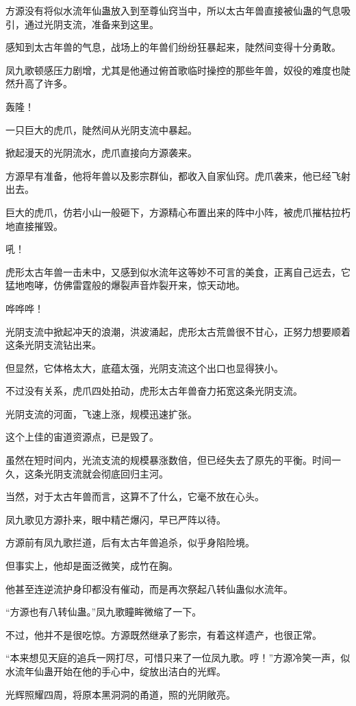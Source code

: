 \begin{this_body}
方源没有将似水流年仙蛊放入到至尊仙窍当中，所以太古年兽直接被仙蛊的气息吸引，通过光阴支流，准备来到这里。

感知到太古年兽的气息，战场上的年兽们纷纷狂暴起来，陡然间变得十分勇敢。

凤九歌顿感压力剧增，尤其是他通过俯首歌临时操控的那些年兽，奴役的难度也陡然升高了许多。

轰隆！

一只巨大的虎爪，陡然间从光阴支流中暴起。

掀起漫天的光阴流水，虎爪直接向方源袭来。

方源早有准备，他将年兽以及影宗群仙，都收入自家仙窍。虎爪袭来，他已经飞射出去。

巨大的虎爪，仿若小山一般砸下，方源精心布置出来的阵中小阵，被虎爪摧枯拉朽地直接摧毁。

吼！

虎形太古年兽一击未中，又感到似水流年这等妙不可言的美食，正离自己远去，它猛地咆哮，仿佛雷霆般的爆裂声音炸裂开来，惊天动地。

哗哗哗！

光阴支流中掀起冲天的浪潮，洪波涌起，虎形太古荒兽很不甘心，正努力想要顺着这条光阴支流钻出来。

但显然，它体格太大，底蕴太强，光阴支流这个出口也显得狭小。

不过没有关系，虎爪四处拍动，虎形太古年兽奋力拓宽这条光阴支流。

光阴支流的河面，飞速上涨，规模迅速扩张。

这个上佳的宙道资源点，已是毁了。

虽然在短时间内，光流支流的规模暴涨数倍，但已经失去了原先的平衡。时间一久，这条光阴支流就会彻底回归主河。

当然，对于太古年兽而言，这算不了什么，它毫不放在心头。

凤九歌见方源扑来，眼中精芒爆闪，早已严阵以待。

方源前有凤九歌拦道，后有太古年兽追杀，似乎身陷险境。

但事实上，他却是面泛微笑，成竹在胸。

他甚至连逆流护身印都没有催动，而是再次祭起八转仙蛊似水流年。

“方源也有八转仙蛊。”凤九歌瞳眸微缩了一下。

不过，他并不是很吃惊。方源既然继承了影宗，有着这样遗产，也很正常。

“本来想见天庭的追兵一网打尽，可惜只来了一位凤九歌。哼！”方源冷笑一声，似水流年仙蛊开始在他的手心中，绽放出洁白的光辉。

光辉照耀四周，将原本黑洞洞的甬道，照的光阴敞亮。


\end{this_body}
